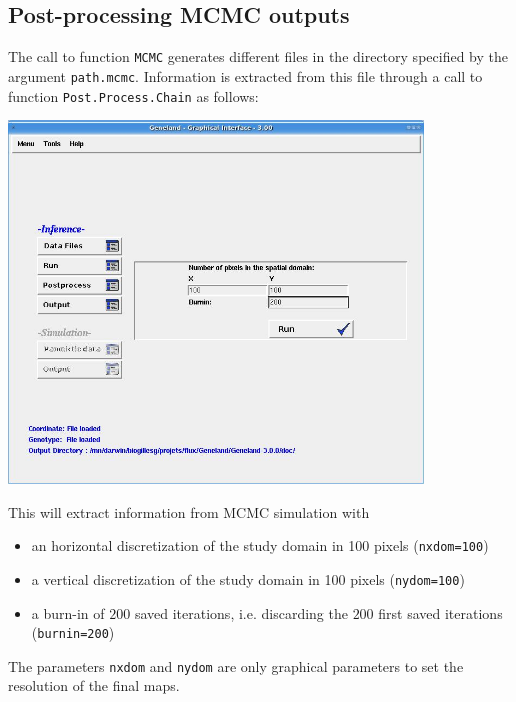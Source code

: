 \documentclass[a4paper,10pt]{article}
\begin{document}
 

\clearpage
\subsection{Post-processing MCMC outputs}



The call to function \texttt{MCMC} generates different files in the directory specified by the argument \texttt{path.mcmc}. 
Information is extracted from this file through a call to function \texttt{Post.Process.Chain} as follows:\\


\centerline{\includegraphics[width=11cm]{./fig/postproc.jpg}}

\bigskip

This will extract information from  MCMC simulation with 
\begin{itemize}
\item an horizontal  discretization of the study domain in 100 pixels (\texttt{nxdom=100})
\item a vertical  discretization of the study domain in 100 pixels (\texttt{nydom=100})
\item a burn-in of $200$ saved  iterations, i.e. discarding the $200$ first saved iterations (\texttt{burnin=200})
\end{itemize}
The parameters \texttt{nxdom} and \texttt{nydom}  are only graphical parameters 
to set the resolution of the final maps. 
\end{document}
